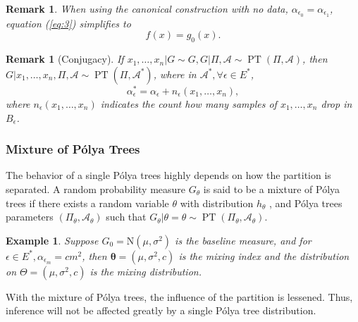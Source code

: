 \documentclass[12pt]{article}
\newtheorem{rmk}[thm]{Remark}
\newtheorem{emp}[thm]{Example}
\newcommand{\polya}{P\'{o}lya}
\DeclareMathOperator{\pt}{PT}
\begin{document}
\begin{rmk}
When using the canonical construction with no data,
$\alpha_{\epsilon_0 } = \alpha_{\epsilon_1}$, equation (\ref{eq:3})
simplifies to 
\begin{displaymath}
f(x) = g_0(x).
\end{displaymath}
\end{rmk}

\begin{rmk}[Conjugacy]
If $x_1, \ldots, x_n | G \sim G, G|\Pi, \mathcal{A} \sim \pt (\Pi,
\mathcal{A})$, then $G|x_1, \ldots, x_n , \Pi, \mathcal{A} \sim \pt
(\Pi, \mathcal{A}^{*})$, where in $\mathcal{A}^{*}, \forall \epsilon
\in E^{*}$, 
\begin{displaymath}
\alpha_{\epsilon}^{*} = \alpha_{\epsilon} + n_{\epsilon}(x_1, \ldots, x_n),
\end{displaymath}
where $n_{\epsilon}(x_1, \ldots, x_n)$ indicates the count how many
samples of $x_1, \ldots, x_n$ drop in $B_{\epsilon}$. 
\end{rmk}

\subsubsection{Mixture of \polya{} Trees}
The behavior of a single \polya{} trees highly depends on how the
partition is separated. A random probability measure $G_\theta$ is
said to be a mixture of \polya{} trees if there exists a random
variable $\theta$ with distribution $h_{\theta}$ , and \polya{} trees
parameters $(\Pi_{\theta}, \mathcal{A}_{\theta})$ such that
$G_{\theta} | \theta=\theta \sim \pt (\Pi_{\theta},
\mathcal{A}_{\theta})$.

\begin{emp}
Suppose $G_0 = \mathrm{N}(\mu, \sigma^2)$ is the baseline measure, and
for $\epsilon \in E^{*}, \alpha_{\epsilon_m} = cm^2 $, then
$\bm{\theta}= (\mu, \sigma^2, c)$ is the mixing index and the
distribution on $\Theta = (\mu, \sigma^2, c) $ is the mixing
distribution. 
\end{emp}
With the mixture of \polya{} trees, the influence of the partition
is lessened. Thus, inference will not be affected greatly by a single
\polya{} tree distribution. 
\end{document}
